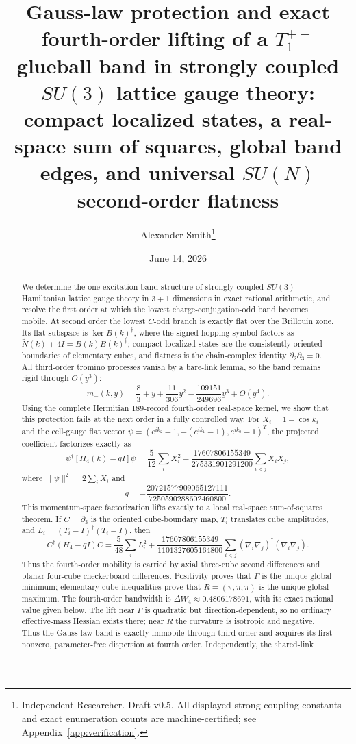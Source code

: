 \documentclass[11pt]{article}
\title{Gauss-law protection and exact fourth-order lifting of a
$T_1^{+-}$ glueball band in strongly coupled $SU(3)$ lattice gauge theory:\\
compact localized states, a real-space sum of squares, global band edges,
and universal $SU(N)$ second-order flatness}
\author{Alexander Smith\thanks{Independent Researcher. Draft v0.5. All displayed
strong-coupling constants and exact enumeration counts are machine-certified;
see Appendix~\ref{app:verification}.}}
\date{June 14, 2026}
\begin{document}
\maketitle

\begin{abstract}
We determine the one-excitation band structure of strongly coupled $SU(3)$
Hamiltonian lattice gauge theory in $3{+}1$ dimensions in exact rational
arithmetic, and resolve the first order at which the lowest
charge-conjugation-odd band becomes mobile. At second order the lowest
$C$-odd branch is exactly flat over the Brillouin zone. Its flat subspace is
$\ker B(k)^\dagger$, where the signed hopping symbol factors as
$\widetilde N(k)+4I=B(k)B(k)^\dagger$; compact localized states are the
consistently oriented boundaries of elementary cubes, and flatness is the
chain-complex identity $\partial_2\partial_3=0$. All third-order tromino
processes vanish by a bare-link lemma, so the band remains rigid through
$O(y^3)$:
\[
m_-(k,y)=\frac83+y+\frac{11}{306}y^2
-\frac{109151}{249696}y^3+O(y^4).
\]
Using the complete Hermitian 189-record fourth-order real-space kernel, we
show that this protection fails at the next order in a fully controlled way.
For $X_i=1-\cos k_i$ and the cell-gauge flat vector
$\psi=(e^{ik_2}-1,-(e^{ik_1}-1),e^{ik_0}-1)^T$, the projected coefficient
factorizes exactly as
\[
\psi^\dagger[H_4(k)-qI]\psi
=\frac5{12}\sum_iX_i^2
+\frac{17607806155349}{275331901291200}
 \sum_{i<j}X_iX_j,
\]
where $\|\psi\|^2=2\sum_iX_i$ and
\[
q=-\frac{20721577909065127111}{7250590288602460800}.
\]
This momentum-space factorization lifts exactly to a local real-space
sum-of-squares theorem. If $C=\partial_3$ is the oriented cube-boundary map,
$T_i$ translates cube amplitudes, and
$L_i=(T_i-I)^\dagger(T_i-I)$, then
\[
C^\dagger(H_4-qI)C
=\frac{5}{48}\sum_iL_i^2
+\frac{17607806155349}{1101327605164800}
 \sum_{i<j}(\nabla_i\nabla_j)^\dagger(\nabla_i\nabla_j).
\]
Thus the fourth-order mobility is carried by axial three-cube second
differences and planar four-cube checkerboard differences. Positivity proves that $\Gamma$ is the unique global minimum; elementary
cube inequalities prove that $R=(\pi,\pi,\pi)$ is the unique global
maximum. The fourth-order bandwidth is $\Delta W_4\approx0.4806178691$,
with its exact rational value given below. The lift near $\Gamma$ is quadratic but
direction-dependent, so no ordinary effective-mass Hessian exists there;
near $R$ the curvature is isotropic and negative. Thus the Gauss-law band is
exactly immobile through third order and acquires its first nonzero,
parameter-free dispersion at fourth order. Independently, the shared-link

\end{abstract}
\end{document}
